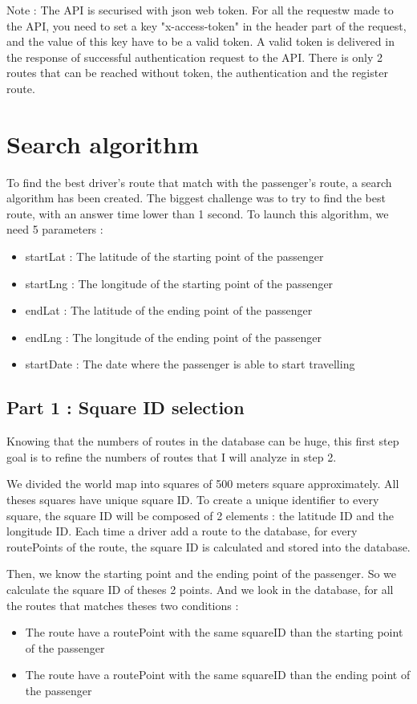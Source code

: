Note : The API is securised with json web token. For all the requestw made to the API, you need to set a key "x-access-token" in the header part of the request, and the value of this key have to be a valid token. A valid token is delivered in the response of successful authentication request to the API. There is only 2 routes that can be reached without token, the authentication and the register route.

\section{Search algorithm}

To find the best driver's route that match with the passenger's route, a search algorithm has been created. The biggest challenge was to try to find the best route, with an answer time lower than 1 second. To launch this algorithm, we need 5 parameters :

\begin{itemize}
    	\item startLat : The latitude of the starting point of the passenger
    	\item startLng : The longitude of the starting point of the passenger
    	\item endLat : The latitude of the ending point of the passenger
    	\item endLng : The longitude of the ending point of the passenger
    	\item startDate : The date where the passenger is able to start travelling
\end{itemize}


\subsection{Part 1 : Square ID selection}
Knowing that the numbers of routes in the database can be huge, this first step goal is to refine the numbers of routes that I will analyze in step 2.

We divided the world map into squares of 500 meters square approximately. All theses squares have unique square ID. To create a unique identifier to every square, the square ID will be composed of 2 elements : the latitude ID and the longitude ID.  Each time a driver add a route to the database, for every routePoints of the route, the square ID is calculated and stored into the database.

Then, we know the starting point and the ending point of the passenger. So we calculate the square ID of theses 2 points. And we look in the database, for all the routes that matches theses two conditions :
\begin{itemize}
	\item The route have a routePoint with the same squareID than the starting point of the passenger
	\item The route have a routePoint with the same squareID than the ending point of the passenger
\end{itemize}


